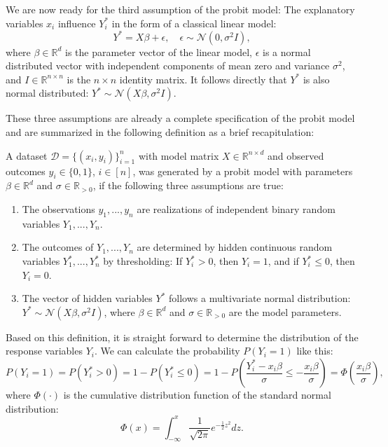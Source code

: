 We are now ready for the third assumption of the probit model:
The explanatory variables
$x_i$ influence $Y_i^\ast$ in the form of a classical linear model:
\begin{equation}
    Y^\ast = X \beta + \epsilon, \quad \epsilon \sim \mathcal{N}(0, \sigma^2 I),
\end{equation}
where $\beta \in \mathbb{R}^d$ is the parameter vector of the linear model,
$\epsilon$ is a normal distributed vector with independent components of
mean zero and variance $\sigma^2$,
and
$I \in \mathbb{R}^{n \times n}$ is the $n \times n$ identity matrix.
It follows directly that $Y^\ast$ is also normal distributed:
$Y^\ast \sim \mathcal{N}(X \beta, \sigma^2 I)$.

These three assumptions are already a complete specification of the
probit model and are summarized in the following definition as a
brief recapitulation:

\begin{definition}
    A dataset $\mathcal{D} = \{(x_i, y_i)\}_{i=1}^n$ with model matrix
    $X \in \mathbb{R}^{n \times d}$ and observed outcomes
    $y_i \in \{0, 1\}$, $i \in [n]$, was generated by a probit model with
    parameters $\beta \in \mathbb{R}^d$ and $\sigma \in \mathbb{R}_{>0}$, if
    the following three assumptions are true:
    \begin{enumerate}
        \item The observations $y_1, ..., y_n$ are realizations of independent
              binary random variables $Y_1, ..., Y_n$.
        \item The outcomes of $Y_1, ..., Y_n$ are determined by hidden
              continuous random variables $Y_1^\ast, ..., Y_n^\ast$ by
              thresholding: If $Y_i^\ast > 0$, then $Y_i = 1$, and if
              $Y_i^\ast \leq 0$, then $Y_i = 0$.
        \item The vector of hidden variables $Y^\ast$ follows a multivariate
              normal distribution:
              $Y^\ast \sim \mathcal{N}(X \beta, \sigma^2 I)$,
              where $\beta \in \mathbb{R}^d$ and $\sigma \in \mathbb{R}_{>0}$
              are the model parameters.
    \end{enumerate}
\end{definition}

\noindent Based on this definition, it is straight forward to determine the
distribution of the response variables $Y_i$.
We can calculate the probability $P(Y_i = 1)$ like this:
\begin{equation*}
    P(Y_i = 1) = P(Y_i^\ast > 0) = 1 - P(Y_i^\ast \leq 0)
    = 1 - P\left(\frac{Y_i^\ast - x_i \beta}{\sigma} \leq -\frac{x_i \beta}{\sigma} \right)
    = \Phi\left(\frac{x_i \beta}{\sigma} \right),
\end{equation*}
where $\Phi(\cdot)$ is the cumulative distribution function of the standard normal
distribution:
\begin{equation*}
    \Phi(x) = \int_{-\infty}^x \frac{1}{\sqrt{2 \pi}} e^{- \frac{1}{2} z^2} dz.
\end{equation*}

